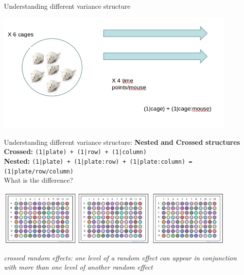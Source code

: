 \documentclass{beamer}
\begin{document}
\begin{frame}{Understanding different variance structure}
 
 \begin{center}
  \includegraphics[width=0.9\textwidth]{Figures/nestedmice}
 \end{center}

\end{frame}



\begin{frame}{Understanding different variance structure: \textbf{Nested and Crossed structures}} 
\textbf{Crossed:} \texttt{(1|plate) + (1|row) + (1|column)}\\
\vspace{0.2cm}
\textbf{Nested:} \texttt{(1|plate) + (1|plate:row) + (1|plate:column) = (1|plate/row/column)}\\

What is the difference?

 \begin{center}
  \includegraphics[width=0.9\textwidth]{Figures/nestedplates}
 \end{center}

 \textit{crossed random effects: one level of a random effect can appear in conjunction with more than one level of another random effect}
\end{frame}
\end{document}
